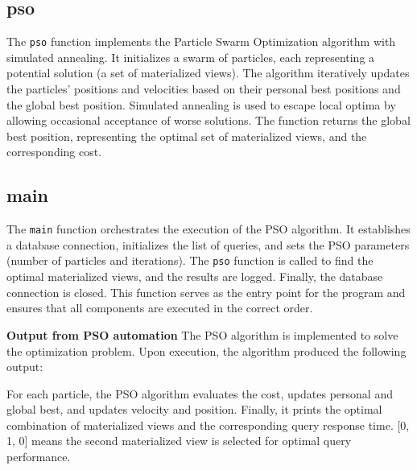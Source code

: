 \subsection*{pso}
The \texttt{pso} function implements the Particle Swarm Optimization algorithm with simulated annealing. It initializes a swarm of particles, each representing a potential solution (a set of materialized views). The algorithm iteratively updates the particles' positions and velocities based on their personal best positions and the global best position. Simulated annealing is used to escape local optima by allowing occasional acceptance of worse solutions. The function returns the global best position, representing the optimal set of materialized views, and the corresponding cost.

\subsection*{main}
The \texttt{main} function orchestrates the execution of the PSO algorithm. It establishes a database connection, initializes the list of queries, and sets the PSO parameters (number of particles and iterations). The \texttt{pso} function is called to find the optimal materialized views, and the results are logged. Finally, the database connection is closed. This function serves as the entry point for the program and ensures that all components are executed in the correct order.



\textbf{Output from PSO automation }  The PSO algorithm is implemented to solve the optimization problem. Upon execution, the algorithm produced the following output: \vspace{.4cm}



   \vspace{.4cm}
  

   \vspace{.4cm}





 For each particle, the PSO algorithm evaluates the cost, updates personal and global best, and updates velocity and position. Finally, it prints the optimal combination of materialized views and the corresponding query response time.
 [0, 1, 0] means the second materialized view is selected for optimal query performance.\vspace{.4cm}
  

